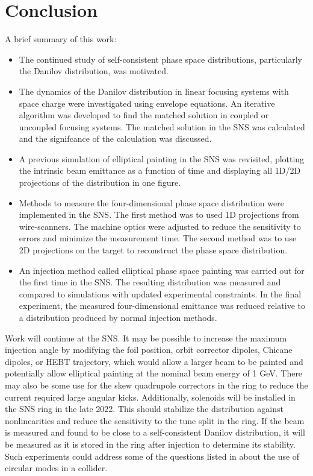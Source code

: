 \chapter{Conclusion} \label{chap-6}

A brief summary of this work:
%
\begin{itemize}
    \item The continued study of self-consistent phase space distributions, particularly the Danilov distribution, was motivated.
    \item The dynamics of the Danilov distribution in linear focusing systems with space charge were investigated using envelope equations. An iterative algorithm was developed to find the matched solution in coupled or uncoupled focusing systems. The matched solution in the SNS was calculated and the signifcance of the calculation was discussed.
    \item A previous simulation of elliptical painting in the SNS was revisited, plotting the intrinsic beam emittance as a function of time and displaying all 1D/2D projections of the distribution in one figure.
    \item Methods to measure the four-dimensional phase space distribution were implemented in the SNS. The first method was to used 1D projections from wire-scanners. The machine optics were adjusted to reduce the sensitivity to errors and minimize the measurement time. The second method was to use 2D projections on the target to reconstruct the phase space distribution. 
    \item An injection method called elliptical phase space painting was carried out for the first time in the SNS. The resulting distribution was measured and compared to simulations with updated experimental constraints. In the final experiment, the measured four-dimensional emittance was reduced relative to a distribution produced by normal injection methods.
\end{itemize}
%

Work will continue at the SNS. It may be possible to increase the maximum injection angle by modifying the foil position, orbit corrector dipoles, Chicane dipoles, or HEBT trajectory, which would allow a larger beam to be painted and potentially allow elliptical painting at the nominal beam energy of 1 GeV. There may also be some use for the skew quadrupole correctors in the ring to reduce the current required large angular kicks. Additionally, solenoids will be installed in the SNS ring in the late 2022. This should stabilize the distribution against nonlinearities and reduce the sensitivity to the tune split in the ring. If the beam is measured and found to be close to a self-consistent Danilov distribution, it will be measured as it is stored in the ring after injection to determine its stability. Such experiments could address some of the questions listed in \cite{Burov2013} about the use of circular modes in a collider. 

